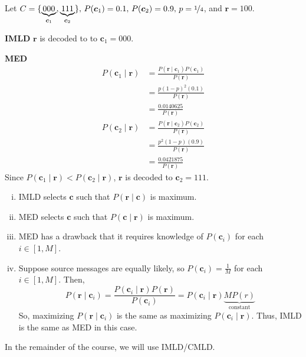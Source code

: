 \begin{exbox}
    \begin{example}[IMLD != MED]
        Let $ C=\{\underbrace{000}_{\bm{c}_1},\underbrace{111}_{\bm{c}_2}\},\,
            P(\bm{c}_1)=0.1,\, P(\bm{c}_2)=0.9,\, p=\nicefrac{1}{4} $, and $ \bm{r}=100 $.

        \textbf{IMLD} $ \bm{r} $ is decoded to to $ \bm{c}_1 = 000 $.

        \textbf{MED}
        \begin{align*}
            P(\bm{c}_1\mid \bm{r})
             & =\frac{P(\bm{r}\mid \bm{c}_1)P(\bm{c}_1)}{P(\bm{r})} \\
             & =\frac{p(1-p)^2(0.1)}{P(\bm{r})}                     \\
             & =\frac{0.0140625}{P(\bm{r})}
        \end{align*}
        \begin{align*}
            P(\bm{c}_2\mid \bm{r})
             & =\frac{P(\bm{r}\mid \bm{c}_2)P(\bm{c}_2)}{P(\bm{r})} \\
             & =\frac{p^2(1-p)(0.9)}{P(\bm{r})}                     \\
             & =\frac{0.0421875}{P(\bm{r})}
        \end{align*}
        Since $ P(\bm{c}_1\mid \bm{r})<P(\bm{c}_2\mid \bm{r}) $,
        $ \bm{r} $ is decoded to $ \bm{c}_2=111 $.
    \end{example}
\end{exbox}

\begin{enumerate}[(i)]
    \item IMLD selects $ \bm{c} $ such that $ P(\bm{r}\mid \bm{c}) $ is maximum.
    \item MED selects $ \bm{c} $ such that $ P(\bm{c}\mid \bm{r}) $ is maximum.
    \item MED has a drawback that it requires knowledge of $ P(\bm{c}_i) $ for
          each $ i\in [1,M] $.
    \item Suppose source messages are equally likely, so
          $ P(\bm{c}_i)=\frac{1}{M} $ for each $ i\in[1,M] $.
          Then,
          \[ P(\bm{r}\mid \bm{c}_i)=\frac{P(\bm{c}_i\mid \bm{r})P(\bm{r})}{P(\bm{c}_i)}
              =P(\bm{c}_i\mid \bm{r}) \underbrace{M P(r)}_{\text{constant}}\]
          So, maximizing $ P(\bm{r}\mid \bm{c}_i) $ is the same as maximizing
          $ P(\bm{c}_i\mid \bm{r}) $. Thus, IMLD is the same as MED in this case.
\end{enumerate}
In the remainder of the course, we will use IMLD/CMLD.